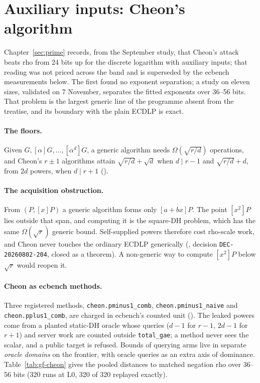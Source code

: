 \section{Auxiliary inputs: Cheon's algorithm}\label{sec:gf-cheon}

Chapter~\ref{sec:prime} records, from the September study, that Cheon's
attack beats rho from 24 bits up for the discrete logarithm with auxiliary
inputs; that reading was not priced across the band and is superseded by
the ecbench measurements below. The first found no exponent separation; a
study on eleven sizes, validated on 7 November, separates the fitted
exponents over 36--56 bits. That problem is the largest generic line of the programme absent
from the treatise, and its boundary with the plain ECDLP is exact.

\paragraph{The floors.} Given $G,[\alpha]G,\ldots,[\alpha^d]G$, a generic
algorithm needs $\Omega(\sqrt{r/d})$ operations, and Cheon's $r\pm1$
algorithms attain $\sqrt{r/d}+\sqrt d$ when $d\mid r-1$ and $\sqrt{r/d}+d$,
from $2d$ powers, when $d\mid r+1$
().

\paragraph{The acquisition obstruction.} From $(P,[x]P)$ a generic
algorithm forms only $[a+bx]P$. The point $[x^2]P$ lies outside that span,
and computing it is the square-DH problem, which has the same
$\Omega(\sqrt r)$ generic bound. Self-supplied powers therefore cost
rho-scale work, and Cheon never touches the ordinary ECDLP generically
(,
decision \texttt{DEC-20260802-204}, closed as a theorem). A non-generic way
to compute $[x^2]P$ below $\sqrt r$ would reopen it.

\paragraph{Cheon as ecbench methods.} Three registered methods,
\texttt{cheon.pminus1\_comb}, \texttt{cheon.pminus1\_naive} and
\texttt{cheon.pplus1\_comb}, are charged in ecbench's counted unit
(). The leaked powers come
from a planted static-DH oracle whose queries ($d-1$ for $r-1$, $2d-1$ for
$r+1$) and server work are counted outside \texttt{total\_gae}; a method
never sees the scalar, and a public target is refused. Bounds of querying
arms live in separate \emph{oracle domains} on the frontier, with oracle
queries as an extra axis of dominance. Table~\ref{tab:gf-cheon} gives the
pooled distances to matched negation rho over 36--56 bits (320 runs at L0,
320 of 320 replayed exactly).

